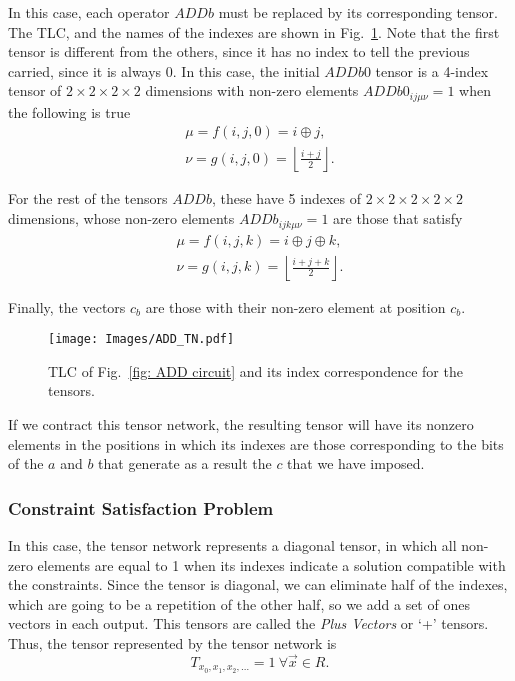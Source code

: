 In this case, each operator $ADDb$ must be replaced by its corresponding tensor. The TLC, and the names of the indexes are shown in Fig.~\ref{fig: TN ADD}. Note that the first tensor is different from the others, since it has no index to tell the previous carried, since it is always 0. In this case, the initial $ADDb0$ tensor is a 4-index tensor of $2\times 2\times 2\times 2$ dimensions with non-zero elements $ADDb0_{ij\mu\nu}=1$ when the following is true
\begin{equation}
\begin{gathered}
    \mu = f(i,j,0) =i\oplus j,\\
    \nu = g(i,j,0) = \left\lfloor\frac{i+j}{2}\right\rfloor.
\end{gathered}
\end{equation}

For the rest of the tensors $ADDb$, these have 5 indexes of $2\times 2\times 2\times 2 \times 2$ dimensions, whose non-zero elements $ADDb_{ijk\mu\nu}=1$ are those that satisfy
\begin{equation}
\begin{gathered}
    \mu = f(i,j,k) =i\oplus j \oplus k,\\
    \nu = g(i,j,k) = \left\lfloor\frac{i+j+k}{2}\right\rfloor.
\end{gathered}
\end{equation}

Finally, the vectors $c_b$ are those with their non-zero element at position $c_b$. 
\begin{figure}
    \centering
    \texttt{[image: Images/ADD\_TN.pdf]}
    \caption{TLC of Fig.~\ref{fig: ADD circuit} and its index correspondence for the tensors.}
    \label{fig: TN ADD}
\end{figure}

If we contract this tensor network, the resulting tensor will have its nonzero elements in the positions in which its indexes are those corresponding to the bits of the $a$ and $b$ that generate as a result the $c$ that we have imposed.

\subsubsection{Constraint Satisfaction Problem}
In this case, the tensor network represents a diagonal tensor, in which all non-zero elements are equal to 1 when its indexes indicate a solution compatible with the constraints. Since the tensor is diagonal, we can eliminate half of the indexes, which are going to be a repetition of the other half, so we add a set of ones vectors in each output. This tensors are called the \textit{Plus Vectors} or `+' tensors. Thus, the tensor represented by the tensor network is
\begin{equation}
    T_{x_0,x_1,x_2,\dots} = 1\ \forall \vec{x} \in R.
\end{equation}

